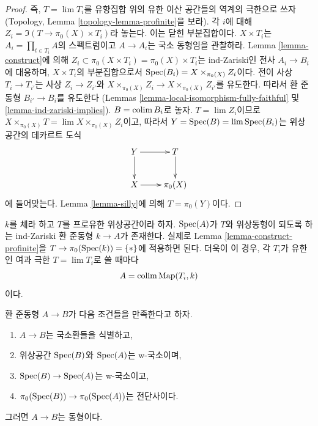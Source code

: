 \begin{proof}
즉, $T = \lim T_i$를 유향집합 위의 유한 이산 공간들의 역계의
극한으로 쓰자(Topology, Lemma \ref{topology-lemma-profinite}을 보라).
각 $i$에 대해 $Z_i = \Im(T \to \pi_0(X) \times T_i)$라 놓는다.
이는 닫힌 부분집합이다. $X \times T_i$는
$A_i = \prod_{t \in T_i} A$의 스펙트럼이고
$A \to A_i$는 국소 동형임을 관찰하라. Lemma \ref{lemma-construct}에 의해
$Z_i \subset \pi_0(X \times T_i) = \pi_0(X) \times T_i$는
ind-Zariski인 전사 $A_i \to B_i$에 대응하며,
$X \times T_i$의 부분집합으로서
$\mathop{\mathrm{Spec}}(B_i) = X \times_{\pi_0(X)} Z_i$이다.
전이 사상 $T_i \to T_{i'}$는 사상
$Z_i \to Z_{i'}$와
$X \times_{\pi_0(X)} Z_i \to X \times_{\pi_0(X)} Z_{i'}$를 유도한다.
따라서 환 준동형 $B_{i'} \to B_i$를 유도한다
(Lemmas \ref{lemma-local-isomorphism-fully-faithful} 및
\ref{lemma-ind-zariski-implies}).
$B = \mathop{\mathrm{colim}}\nolimits B_i$로 놓자. $T = \lim Z_i$이므로
$X \times_{\pi_0(X)} T = \lim  X \times_{\pi_0(X)} Z_i$이고,
따라서 $Y = \mathop{\mathrm{Spec}}(B) = \mathop{\mathrm{lim}}\nolimits \mathop{\mathrm{Spec}}(B_i)$는 위상공간의 데카르트 도식
$$
\xymatrix{
Y \ar[r] \ar[d] & T \ar[d] \\
X \ar[r] & \pi_0(X)
}
$$
에 들어맞는다. Lemma \ref{lemma-silly}에 의해 $T = \pi_0(Y)$이다.
\end{proof}

\begin{example}
\label{example-construct-space}
$k$를 체라 하고 $T$를 프로유한 위상공간이라 하자.
$\mathop{\mathrm{Spec}}(A)$가 $T$와 위상동형이 되도록 하는 ind-Zariski 환 준동형
$k \to A$가 존재한다. 실제로 Lemma \ref{lemma-construct-profinite}을
$T \to \pi_0(\mathop{\mathrm{Spec}}(k)) = \{*\}$에 적용하면 된다.
더욱이 이 경우, 각 $T_i$가 유한인 여과 극한
$T = \lim T_i$로 쓸 때마다
$$
A = \mathop{\mathrm{colim}}\nolimits \text{Map}(T_i, k)
$$
이다.
\end{example}

\begin{lemma}
\label{lemma-w-local-morphism-equal-points-stalks-is-iso}
환 준동형 $A \to B$가 다음 조건들을 만족한다고 하자.
\begin{enumerate}
\item $A \to B$는 국소환들을 식별하고,
\item 위상공간 $\mathop{\mathrm{Spec}}(B)$와 $\mathop{\mathrm{Spec}}(A)$는 w-국소이며,
\item $\mathop{\mathrm{Spec}}(B) \to \mathop{\mathrm{Spec}}(A)$는 w-국소이고,
\item $\pi_0(\mathop{\mathrm{Spec}}(B)) \to \pi_0(\mathop{\mathrm{Spec}}(A))$는 전단사이다.
\end{enumerate}
그러면 $A \to B$는 동형이다.
\end{lemma}

